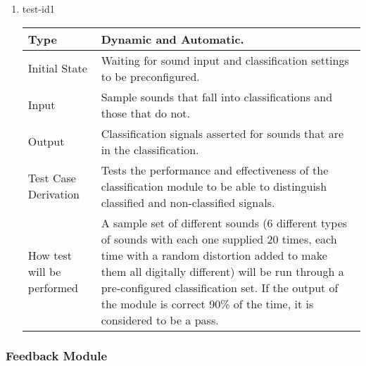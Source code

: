 \documentclass[12pt, titlepage]{article}
\begin{document}
\begin{enumerate}

\item{test-id1\\}

\begin{tabular}{ |p{5cm}||p{7cm}| }
    \hline
    Type & Dynamic and Automatic. \\
    \hline
    Initial State  &  Waiting for sound input and classification settings to be preconfigured. \\
    \hline
    Input &   Sample sounds that fall into classifications and those that do not. \\
    \hline
    Output &   Classification signals asserted for sounds that are in the classification.  \\
    \hline
    Test Case Derivation &   Tests the performance and effectiveness of the classification module to be able to distinguish classified and non-classified signals. \\
    \hline
    How test will be performed & A sample set of different sounds (6 different types of sounds with each one supplied 20 times, each time with a random distortion added to make them all digitally different) will be run through a pre-configured classification set. If the output of the module is correct 90\% of the time, it is considered to be a pass. \\
    \hline
\end{tabular}

\end{enumerate}


\subsubsection{Feedback Module}
\end{document}
